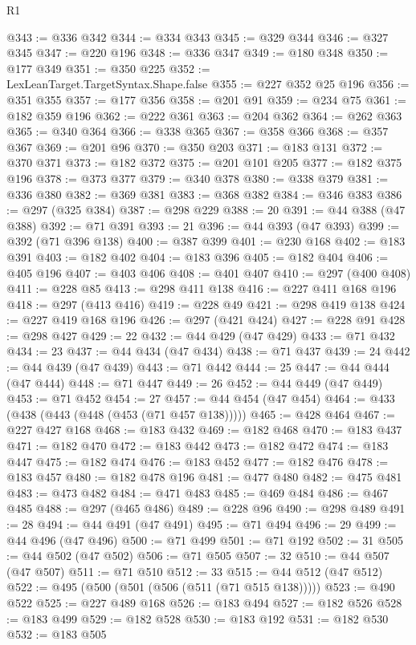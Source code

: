 \begin{lexlean}{R1}
\begin{coremodule}
@343 := @336 @342
@344 := @334 @343
@345 := @329 @344
@346 := @327 @345
@347 := @220 @196
@348 := @336 @347
@349 := @180 @348
@350 := @177 @349
@351 := @350 @225
@352 := LexLeanTarget.TargetSyntax.Shape.false
@355 := @227 @352 @25 @196
@356 := @351 @355
@357 := @177 @356
@358 := @201 @91
@359 := @234 @75
@361 := @182 @359 @196
@362 := @222 @361
@363 := @204 @362
@364 := @262 @363
@365 := @340 @364
@366 := @338 @365
@367 := @358 @366
@368 := @357 @367
@369 := @201 @96
@370 := @350 @203
@371 := @183 @131
@372 := @370 @371
@373 := @182 @372
@375 := @201 @101 @205
@377 := @182 @375 @196
@378 := @373 @377
@379 := @340 @378
@380 := @338 @379
@381 := @336 @380
@382 := @369 @381
@383 := @368 @382
@384 := @346 @383
@386 := @297 (@325 @384)
@387 := @298 @229
@388 := 20
@391 := @44 @388 (@47 @388)
@392 := @71 @391
@393 := 21
@396 := @44 @393 (@47 @393)
@399 := @392 (@71 @396 @138)
@400 := @387 @399
@401 := @230 @168
@402 := @183 @391
@403 := @182 @402
@404 := @183 @396
@405 := @182 @404
@406 := @405 @196
@407 := @403 @406
@408 := @401 @407
@410 := @297 (@400 @408)
@411 := @228 @85
@413 := @298 @411 @138
@416 := @227 @411 @168 @196
@418 := @297 (@413 @416)
@419 := @228 @49
@421 := @298 @419 @138
@424 := @227 @419 @168 @196
@426 := @297 (@421 @424)
@427 := @228 @91
@428 := @298 @427
@429 := 22
@432 := @44 @429 (@47 @429)
@433 := @71 @432
@434 := 23
@437 := @44 @434 (@47 @434)
@438 := @71 @437
@439 := 24
@442 := @44 @439 (@47 @439)
@443 := @71 @442
@444 := 25
@447 := @44 @444 (@47 @444)
@448 := @71 @447
@449 := 26
@452 := @44 @449 (@47 @449)
@453 := @71 @452
@454 := 27
@457 := @44 @454 (@47 @454)
@464 := @433 (@438 (@443 (@448 (@453 (@71 @457 @138)))))
@465 := @428 @464
@467 := @227 @427 @168
@468 := @183 @432
@469 := @182 @468
@470 := @183 @437
@471 := @182 @470
@472 := @183 @442
@473 := @182 @472
@474 := @183 @447
@475 := @182 @474
@476 := @183 @452
@477 := @182 @476
@478 := @183 @457
@480 := @182 @478 @196
@481 := @477 @480
@482 := @475 @481
@483 := @473 @482
@484 := @471 @483
@485 := @469 @484
@486 := @467 @485
@488 := @297 (@465 @486)
@489 := @228 @96
@490 := @298 @489
@491 := 28
@494 := @44 @491 (@47 @491)
@495 := @71 @494
@496 := 29
@499 := @44 @496 (@47 @496)
@500 := @71 @499
@501 := @71 @192
@502 := 31
@505 := @44 @502 (@47 @502)
@506 := @71 @505
@507 := 32
@510 := @44 @507 (@47 @507)
@511 := @71 @510
@512 := 33
@515 := @44 @512 (@47 @512)
@522 := @495 (@500 (@501 (@506 (@511 (@71 @515 @138)))))
@523 := @490 @522
@525 := @227 @489 @168
@526 := @183 @494
@527 := @182 @526
@528 := @183 @499
@529 := @182 @528
@530 := @183 @192
@531 := @182 @530
@532 := @183 @505

\end{coremodule}
\end{lexlean}
